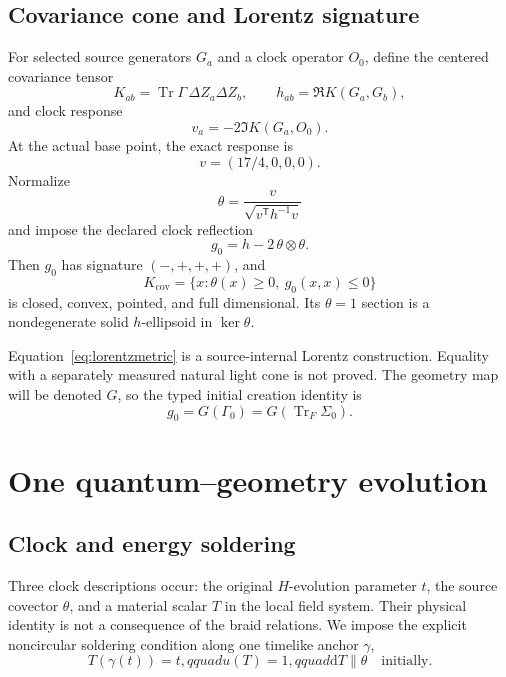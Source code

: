 \documentclass[11pt]{article}
\theoremstyle{definition}
\theoremstyle{remark}
\newcommand{\Tr}{\operatorname{Tr}}
\newcommand{\dd}{\mathrm{d}}
\newcommand{\Ker}{\operatorname{ker}}
\begin{document}
\subsection{Covariance cone and Lorentz signature}

For selected source generators $G_a$ and a clock operator $O_0$, define the centered covariance tensor
\begin{equation}
  K_{ab}=\Tr\Gamma\,\Delta Z_a\Delta Z_b,
  \qquad h_{ab}=\Re K(G_a,G_b),
\end{equation}
and clock response
\begin{equation}
  v_a=-2\Im K(G_a,O_0).
\end{equation}
At the actual base point, the exact response is
\begin{equation}
  v=(17/4,0,0,0).
\end{equation}
Normalize
\begin{equation}
  \theta=\frac{v}{\sqrt{v^{\mathsf T}h^{-1}v}}
\end{equation}
and impose the declared clock reflection
\begin{equation}\label{eq:lorentzmetric}
  g_0=h-2\,\theta\otimes\theta.
\end{equation}
Then $g_0$ has signature $(-,+,+,+)$, and
\begin{equation}
  K_{\mathrm{cov}}=\{x:\theta(x)\ge0,\ g_0(x,x)\le0\}
\end{equation}
is closed, convex, pointed, and full dimensional. Its $\theta=1$ section is a nondegenerate solid $h$-ellipsoid in $\Ker\theta$.

Equation~\eqref{eq:lorentzmetric} is a source-internal Lorentz construction. Equality with a separately measured natural light cone is not proved. The geometry map will be denoted $G$, so the typed initial creation identity is
\begin{equation}\label{eq:creation}
  g_0=G(\Gamma_0)=G(\Tr_F\Sigma_0).
\end{equation}

\section{One quantum--geometry evolution}

\subsection{Clock and energy soldering}

Three clock descriptions occur: the original $H$-evolution parameter $t$, the source covector $\theta$, and a material scalar $T$ in the local field system. Their physical identity is not a consequence of the braid relations. We impose the explicit noncircular soldering condition along one timelike anchor $\gamma$,
\begin{equation}\label{eq:clock}
  T(\gamma(t))=t,qquad u(T)=1,qquad \dd T\parallel\theta\quad\text{initially}.
\end{equation}
\end{document}
